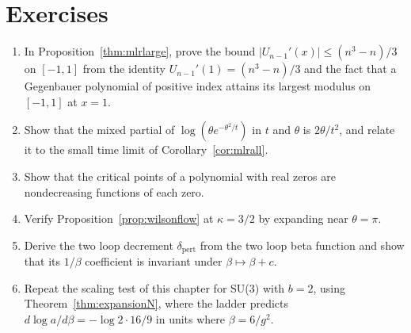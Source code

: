 \section*{Exercises}
\begin{enumerate}
\item In Proposition~\ref{thm:mlrlarge}, prove the bound $|U_{n-1}'(x)|\le(n^3-n)/3$ on $[-1,1]$ from the identity $U_{n-1}'(1)=(n^3-n)/3$ and the fact that a Gegenbauer polynomial of positive index attains its largest modulus on $[-1,1]$ at $x=1$.
\item Show that the mixed partial of $\log(\theta e^{-\theta^2/t})$ in $t$ and $\theta$ is $2\theta/t^2$, and relate it to the small time limit of Corollary~\ref{cor:mlrall}.
\item Show that the critical points of a polynomial with real zeros are nondecreasing functions of each zero.
\item Verify Proposition~\ref{prop:wilsonflow} at $\kappa=3/2$ by expanding near $\theta=\pi$.
\item Derive the two loop decrement $\delta_{\mathrm{pert}}$ from the two loop beta function and show that its $1/\beta$ coefficient is invariant under $\beta\mapsto\beta+c$.
\item Repeat the scaling test of this chapter for SU(3) with $b=2$, using Theorem~\ref{thm:expansionN}, where the ladder predicts $d\log a/d\beta=-\log2\cdot16/9$ in units where $\beta=6/g^2$.
\end{enumerate}

